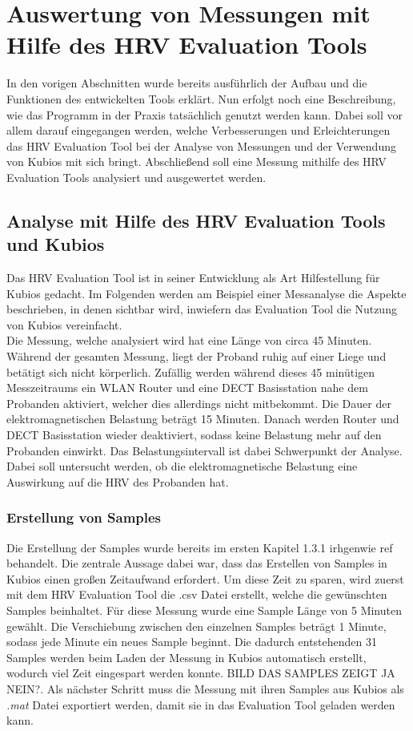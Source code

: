 
\chapter{Auswertung von Messungen mit Hilfe des HRV Evaluation Tools}
In den vorigen Abschnitten wurde bereits ausführlich der Aufbau und die Funktionen des entwickelten Tools erklärt. Nun erfolgt noch eine Beschreibung, wie das Programm in der Praxis tatsächlich genutzt werden kann. Dabei soll vor allem darauf eingegangen werden, welche Verbesserungen und Erleichterungen das HRV Evaluation Tool bei der Analyse von Messungen und der Verwendung von Kubios mit sich bringt. Abschließend soll eine Messung mithilfe des HRV Evaluation Tools analysiert und ausgewertet werden.



\section{Analyse mit Hilfe des  HRV Evaluation Tools und Kubios}
Das HRV Evaluation Tool ist in seiner Entwicklung als Art Hilfestellung für Kubios gedacht. Im Folgenden werden am Beispiel einer Messanalyse die Aspekte beschrieben, in denen sichtbar wird, inwiefern das Evaluation Tool die Nutzung von Kubios vereinfacht.\\

Die Messung, welche analysiert wird hat eine Länge von circa 45 Minuten. Während der gesamten Messung, liegt der Proband ruhig auf einer Liege und betätigt sich nicht körperlich. Zufällig werden während dieses 45 minütigen Messzeitraums ein WLAN Router und eine DECT Basisstation nahe dem Probanden aktiviert, welcher dies allerdings nicht mitbekommt. Die Dauer der elektromagnetischen Belastung beträgt 15 Minuten. Danach werden Router und DECT Basisstation wieder deaktiviert, sodass keine Belastung mehr auf den Probanden einwirkt. Das Belastungsintervall ist dabei Schwerpunkt der Analyse. Dabei soll untersucht werden, ob die elektromagnetische Belastung eine Auswirkung auf die HRV des Probanden hat.

\subsection{Erstellung von Samples}
Die Erstellung der Samples wurde bereits im ersten Kapitel \color{red} 1.3.1 irhgenwie ref \color{black} behandelt. Die zentrale Aussage dabei war, dass das Erstellen von Samples in Kubios einen großen Zeitaufwand erfordert. Um diese Zeit zu sparen, wird zuerst mit dem HRV Evaluation Tool \color{red} die .csv Datei erstellt, welche die gewünschten Samples beinhaltet. \color{black}
Für diese Messung wurde eine Sample Länge von 5 Minuten gewählt. Die Verschiebung zwischen den einzelnen Samples beträgt 1 Minute, sodass jede Minute ein neues Sample beginnt. Die dadurch entstehenden 31 Samples werden beim Laden der Messung in Kubios automatisch erstellt, wodurch viel Zeit eingespart werden konnte.  
\color{red} BILD DAS SAMPLES ZEIGT JA NEIN?. \color{black}
Als nächster Schritt muss die Messung mit ihren Samples aus Kubios als \textit{.mat} Datei exportiert werden, damit sie in das Evaluation Tool geladen werden kann. 


